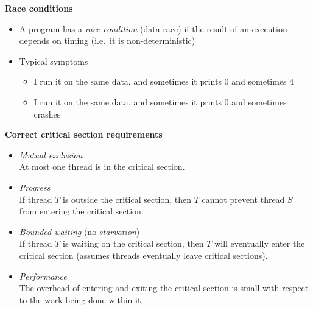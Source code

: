 \documentclass[11pt,a4paper]{article}
\begin{document}
\textbf{Race conditions}
\begin{itemize}
    \item A program has a \emph{race condition} (data race) if the result of an
        execution depends on timing (i.e.\ it is non-deterministic)
    \item Typical symptoms
        \begin{itemize}
            \item I run it on the same data, and sometimes it prints 0 and sometimes 4
            \item I run it on the same data, and sometimes it prints 0 and sometimes crashes
        \end{itemize}
\end{itemize}

\textbf{Correct critical section requirements}
\begin{itemize}
    \item \emph{Mutual exclusion} \\
        At most one thread is in the critical section.
    \item \emph{Progress} \\
        If thread $T$ is outside the critical section,
        then $T$ cannot prevent thread $S$ from entering the critical section.
    \item \emph{Bounded waiting} (no \emph{starvation}) \\
        If thread $T$ is waiting on the critical section,
        then $T$ will eventually enter the critical section
        (assumes threads eventually leave critical sections).
    \item \emph{Performance} \\
        The overhead of entering and exiting the critical section is small with respect to
        the work being done within it.
\end{itemize}
\end{document}
